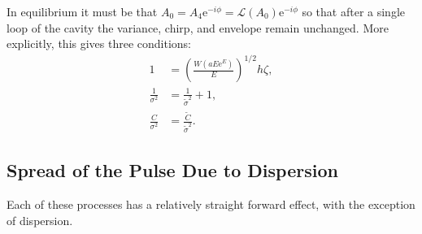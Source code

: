 In equilibrium it must be that $A_0 = A_4 \textrm{e}^{-i \phi} = \mathcal{L}(A_0) \textrm{e}^{- i \phi}$ so that after a single loop of the cavity the variance, chirp, and envelope remain unchanged. More explicitly, this gives three conditions:
\begin{subequations}
\begin{align}
\label{eq:energycond}
1 &= \left( \frac{W(a E \textrm{e}^E)}{E} \right)^{1/2} h \zeta, \\
\label{eq:varcond}
\frac{1}{\sigma^2} &= \frac{1}{\widetilde{\sigma}^2} + 1, \\
\label{eq:chirpcond}
\frac{C}{\sigma^2} &= \frac{\widetilde{C}}{\widetilde{\sigma}^2}.
\end{align}
\label{eq:linsys}
\end{subequations}

\subsection{Spread of the Pulse Due to Dispersion}
Each of these processes has a relatively straight forward effect, with the exception of dispersion.


